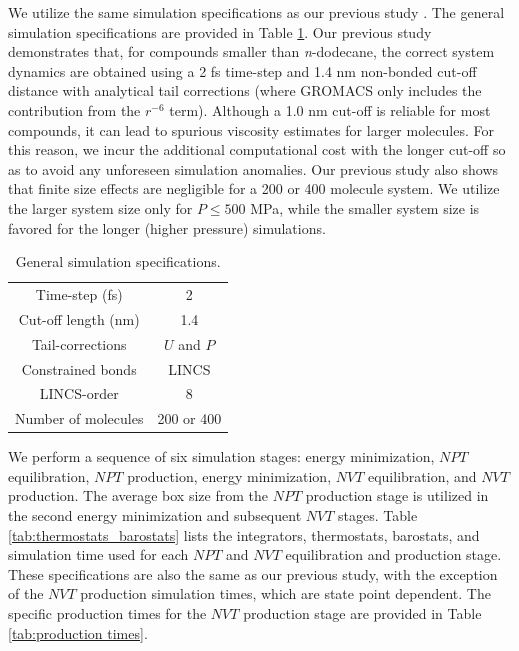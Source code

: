 \documentclass[preprint,review,12pt]{elsarticle}
\begin{document}
    We utilize the same simulation specifications as our previous study \cite{Postdoc_3}. The general simulation specifications are provided in Table \ref{tab:sim_specs}. Our previous study demonstrates that, for compounds smaller than \textit{n}-dodecane, the correct system dynamics are obtained using a 2 fs time-step and 1.4 nm non-bonded cut-off distance with analytical tail corrections (where GROMACS only includes the contribution from the $r^{-6}$ term). Although a 1.0 nm cut-off is reliable for most compounds, it can lead to spurious viscosity estimates for larger molecules. For this reason, we incur the additional computational cost with the longer cut-off so as to avoid any unforeseen simulation anomalies. Our previous study also shows that finite size effects are negligible for a 200 or 400 molecule system. We utilize the larger system size only for $P \le 500$ MPa, while the smaller system size is favored for the longer (higher pressure) simulations.
	 
	\begin{table}[htb!]
		\caption{General simulation specifications.} \label{tab:sim_specs}
		\begin{center}
			\begin{tabular}{|c|c|}
				\hline
				Time-step (fs) & 2 \\
				Cut-off length (nm) & 1.4 \\
				Tail-corrections & $U$ and $P$ \\
				Constrained bonds & LINCS \cite{Hess1998,Hess2008} \\
				LINCS-order & 8 \\			     
				Number of molecules & 200 or 400 \\
				\hline        
			\end{tabular}
		\end{center}
	\end{table}

	We perform a sequence of six simulation stages: energy minimization, $NPT$ equilibration, $NPT$ production, energy minimization, $NVT$ equilibration, and $NVT$ production. The average box size from the $NPT$ production stage is utilized in the second energy minimization and subsequent $NVT$ stages. Table \ref{tab:thermostats_barostats} lists the integrators, thermostats, barostats, and simulation time used for each $NPT$ and $NVT$ equilibration and production stage. These specifications are also the same as our previous study, with the exception of the $NVT$ production simulation times, which are state point dependent. The specific production times for the $NVT$ production stage are provided in Table \ref{tab:production times}.
\end{document}
